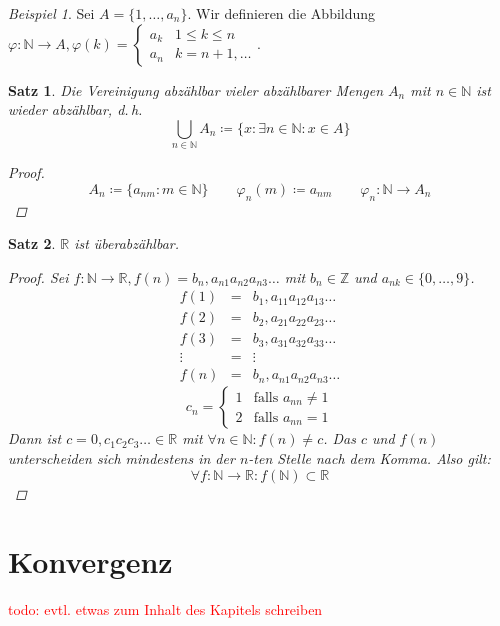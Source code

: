 \documentclass[ngerman,titlepage,twoside, parskip=half*]{scrreprt}
\newcommand*{\N}{\mathbb{N}}
\newcommand*{\Z}{\mathbb{Z}}
\newcommand*{\R}{\mathbb{R}}
\theoremstyle{plain}
\newtheorem{theorem}{Satz}[section]
\theoremstyle{definition}
\theoremstyle{remark}
\newtheorem*{beispiel}{Beispiel}
\newcommand*{\todo}[1]{\textcolor{red}{todo: #1}}
\begin{document}
\begin{beispiel}
  Sei $A=\{1,\ldots ,a_n\}$. Wir definieren die Abbildung $\varphi \colon \N
  \rightarrow A, \varphi (k) =
    \begin{cases}
      a_k &  1 \leq k \leq n\\
      a_n &  k=n+1,\ldots
    \end{cases}$.
\end{beispiel}

\begin{theorem}
  Die Vereinigung abzählbar vieler abzählbarer Mengen $A_n$ mit $n \in \N$
  ist wieder abzählbar, d.\,h.
  \[\bigcup_{n \in \N} A_n \coloneqq \{x \colon \exists n \in \N \colon x \in
  A\}\]
\begin{proof}
  \[A_n \coloneqq\{a_{nm}\colon m\in \N\} \qquad \varphi_n(m)\coloneqq a_{nm} \qquad
  \varphi_n\colon\N \rightarrow A_n\]
\end{proof}
\end{theorem}

\begin{theorem}
  $\R$ ist überabzählbar.
\begin{proof}
  Sei $f\colon\N \rightarrow \R, f(n) = b_n,a_{n1}a_{n2}a_{n3}\ldots$ mit
  $b_n \in \Z$ und  $a_{nk} \in \{0,\ldots ,9\}$.
\[\begin{array}{ccc}
  f(1) & = & b_{1},a_{11}a_{12}a_{13}\ldots\\
  f(2) & = & b_{2},a_{21}a_{22}a_{23}\ldots\\
  f(3) & = & b_{3},a_{31}a_{32}a_{33}\ldots\\
  \vdots & = & \vdots \\
  f(n) & = & b_{n},a_{n1}a_{n2}a_{n3}\ldots
\end{array}\]
\[c_n =
\begin{cases}
  1 & \text{falls } a_{nn} \neq 1\\
  2 & \text{falls } a_{nn} = 1
\end{cases}\]
Dann ist $c=0,c_{1}c_{2}c_{3}\ldots \in \R$ mit $\forall n \in \N\colon
f(n) \neq c$. Das
$c$ und $f(n)$ unterscheiden sich mindestens in der $n$-ten Stelle
nach dem Komma. Also gilt:
\[\forall f\colon \N \rightarrow \R \colon f(\N) \subset \R\]
\end{proof}
\end{theorem}

\chapter{Konvergenz}
\todo{evtl. etwas zum Inhalt des Kapitels schreiben}
\end{document}

